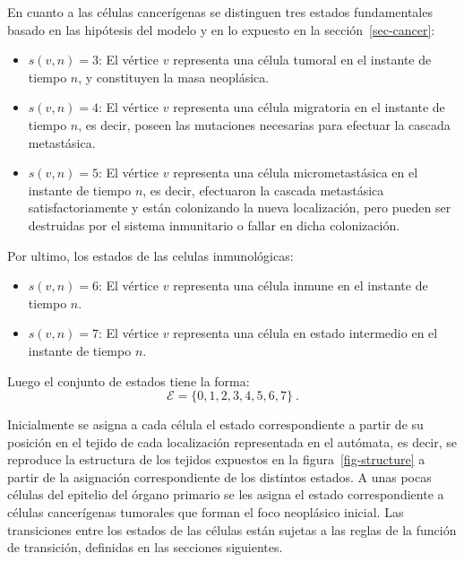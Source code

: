 En cuanto a las c\'elulas cancer\'igenas se distinguen tres estados fundamentales basado en las hip\'otesis del modelo y en lo expuesto en la secci\'on~\ref{sec-cancer}:

\begin{itemize}
\item $s(v,n)=3$: El v\'ertice $v$ representa una c\'elula tumoral en el instante de tiempo $n$, y constituyen la masa neopl\'asica.

\item $s(v,n)=4$: El v\'ertice $v$ representa una c\'elula migratoria en el instante de tiempo $n$, es decir, poseen las mutaciones necesarias para efectuar la cascada metast\'asica.

\item $s(v,n)=5$: El v\'ertice $v$ representa una c\'elula micrometast\'asica en el instante de tiempo $n$, es decir, efectuaron la cascada metast\'a\-sica satisfactoriamente y est\'an colonizando la nueva localizaci\'on, pero pueden ser destruidas por el sistema inmunitario o fallar en dicha colonizaci\'on. 
\end{itemize}

Por ultimo, los estados de las celulas inmunol\'ogicas:
\begin{itemize}
    \item $s(v, n) = 6$: El v\'ertice $v$ representa una c\'elula inmune en el instante de tiempo $n$.
    \item $s(v, n) = 7$: El v\'ertice $v$ representa una c\'elula en estado intermedio en el instante de tiempo $n$.
\end{itemize}

Luego el conjunto de estados tiene la forma:
\begin{equation}
\boxed{\mathcal{E} = \lbrace 0, 1, 2, 3, 4, 5, 6, 7 \rbrace}~. \label{eq-states}
\end{equation}

Inicialmente se asigna a cada c\'elula el estado correspondiente a partir de su posici\'on en el tejido de cada localizaci\'on representada en el aut\'omata, es decir, se reproduce la estructura de los tejidos expuestos en la figura~\ref{fig-structure} a partir de la asignaci\'on correspondiente de los distintos estados. A unas pocas c\'elulas del epitelio del \'organo primario se les asigna el estado correspondiente a c\'elulas cancer\'igenas tumorales que forman el foco neopl\'asico inicial. Las transiciones entre los estados de las c\'elulas est\'an sujetas a las reglas de la funci\'on de transici\'on, definidas en las secciones siguientes.

